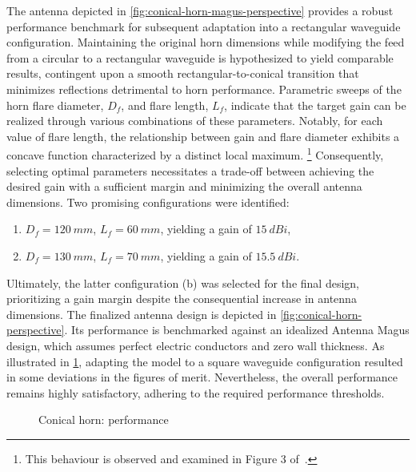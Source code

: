\documentclass[11pt,a4paper,twoside,openany]{report}
\begin{document}
The antenna depicted in \cref{fig:conical-horn-magus-perspective} provides a robust performance benchmark for subsequent adaptation into a rectangular waveguide configuration. Maintaining the original horn dimensions while modifying the feed from a circular to a rectangular waveguide is hypothesized to yield comparable results, contingent upon a smooth rectangular-to-conical transition that minimizes reflections detrimental to horn performance. Parametric sweeps of the horn flare diameter, $D_f$, and flare length, $L_f$, indicate that the target gain can be realized through various combinations of these parameters. Notably, for each value of flare length, the relationship between gain and flare diameter exhibits a concave function characterized by a distinct local maximum.%
    \footnote{This behaviour is observed and examined in Figure 3 of~\parencite{aboserwal-et-al:conical-horn-gain-and-amplitude-patterns}.}
Consequently, selecting optimal parameters necessitates a trade-off between achieving the desired gain with a sufficient margin and minimizing the overall antenna dimensions. Two promising configurations were identified:
\begin{enumerate}[label=(\alph*)]
    \item $D_f = \qty{120}{mm}$, $L_f = \qty{60}{mm}$, yielding a gain of $\qty{15}{dBi}$,
    \item $D_f = \qty{130}{mm}$, $L_f = \qty{70}{mm}$, yielding a gain of $\qty{15.5}{dBi}$.
\end{enumerate}
Ultimately, the latter configuration (b) was selected for the final design, prioritizing a gain margin despite the consequential increase in antenna dimensions. The finalized antenna design is depicted in \cref{fig:conical-horn-perspective}. Its performance is benchmarked against an idealized Antenna Magus design, which assumes perfect electric conductors and zero wall thickness. As illustrated in \cref{fig:conical-horn-performance-comparison}, adapting the model to a square waveguide configuration resulted in some deviations in the figures of merit. Nevertheless, the overall performance remains highly satisfactory, adhering to the required performance thresholds.

\begin{figure}[!ht]
    \centering
    
    \caption{\label{fig:conical-horn-performance-comparison}Conical horn: performance}
\end{figure}
\end{document}
